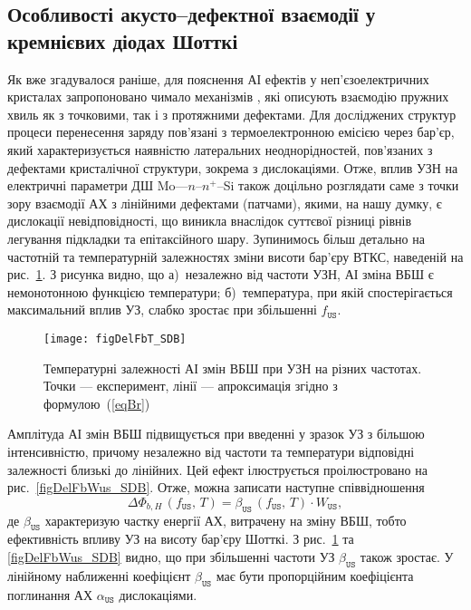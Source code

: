 \subsection{Особливості акусто--дефектної взаємодії у кремнієвих діодах Шотткі}

Як вже згадувалося раніше, для пояснення АІ ефектів у неп'єзоелектричних кристалах
запропоновано чимало механізмів \cite{Pavlovich,Korotchenkov1995,MirzadeJAP2011,PELESHCHAK:UPJ2016,Krevchik,MirzadeJAP2005,Davletova2008,OstrovKor92},
які описують взаємодію пружних хвиль як з точковими, так і з протяжними дефектами.
Для досліджених структур процеси перенесення заряду пов'язані з термоелектронною емісією
через бар'єр, який характеризується наявністю латеральних неоднорідностей, пов'язаних з дефектами
кристалічної структури, зокрема з дислокаціями.
Отже, вплив УЗН на електричні параметри ДШ Mo---$n$--$n^+$--Si також доцільно розглядати саме з точки зору
взаємодії АХ з лінійними дефектами (патчами), якими, на нашу думку, є дислокації невідповідності, що
виникла внаслідок суттєвої різниці рівнів легування підкладки та епітаксійного шару.
Зупинимось більш детально на частотній та температурній залежностях зміни висоти бар'єру ВТКС,
наведеній на рис.~\ref{figDelFbT_SDB}.
З рисунка видно, що
а)~незалежно від частоти УЗН, АІ зміна ВБШ є немонотонною функцією температури;
б)~температура, при якій спостерігається максимальний вплив УЗ, слабко зростає при збільшенні $f_\mathtt{US}$.

\begin{figure}
\center
\texttt{[image: figDelFbT\_SDB]}
\caption{\label{figDelFbT_SDB}
Температурні залежності АІ змін ВБШ при УЗН на різних частотах.
Точки --- експеримент,
лінії --- апроксимація згідно з формулою~(\ref{eqBr})
}%
\end{figure}

Амплітуда АІ змін ВБШ підвищується при введенні у зразок УЗ з більшою інтенсивністю, причому незалежно від частоти та температури
відповідні залежності близькі до лінійних.
Цей ефект ілюструється проілюстровано на рис.~\ref{figDelFbWus_SDB}.
Отже, можна записати наступне співвідношення
\begin{equation}
\label{eqBt}
\Delta\Phi_{b,H}\,(f_\mathtt{US},\,T)=\beta_\mathtt{US}\,(f_\mathtt{US},\,T)\cdot W_\mathtt{US},
\end{equation}
де
$\beta_\mathtt{US}$ характеризую частку енергії АХ, витрачену на зміну ВБШ, тобто
ефективність впливу УЗ на висоту бар'єру Шотткі.
З рис.~\ref{figDelFbT_SDB} та \ref{figDelFbWus_SDB} видно, що при збільшенні частоти УЗ $\beta_\mathtt{US}$ також зростає.
У лінійному наближенні коефіцієнт $\beta_\mathtt{US}$ має бути пропорційним коефіцієнта поглинання АХ $\alpha_\mathtt{US}$ дислокаціями.

